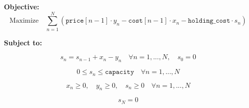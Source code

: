\documentclass{article}
\begin{document}
\textbf{Objective:}
\[
\text{Maximize} \quad \sum_{n=1}^{N} \left( \texttt{price}[n-1] \cdot y_n - \texttt{cost}[n-1] \cdot x_n - \texttt{holding_cost} \cdot s_n \right)
\]

\textbf{Subject to:}

\[
s_{n} = s_{n-1} + x_n - y_n \quad \forall n=1,...,N, \quad s_0 = 0
\]

\[
0 \leq s_n \leq \texttt{capacity} \quad \forall n=1,...,N
\]

\[
x_n \geq 0, \quad y_n \geq 0, \quad s_n \geq 0 \quad \forall n=1,...,N
\]

\[
s_N = 0
\]
\end{document}
